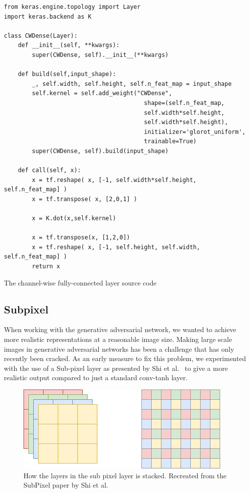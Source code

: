 \begin{listing}[h]
\begin{verbatim}
from keras.engine.topology import Layer
import keras.backend as K

class CWDense(Layer):
    def __init__(self, **kwargs):
        super(CWDense, self).__init__(**kwargs)
    
    def build(self,input_shape):
        _, self.width, self.height, self.n_feat_map = input_shape
        self.kernel = self.add_weight("CWDense",
                                        shape=(self.n_feat_map,
                                        self.width*self.height,
                                        self.width*self.height),
                                        initializer='glorot_uniform',
                                        trainable=True)        
        super(CWDense, self).build(input_shape)

    def call(self, x):
        x = tf.reshape( x, [-1, self.width*self.height, self.n_feat_map] )
        x = tf.transpose( x, [2,0,1] )

        x = K.dot(x,self.kernel)

        x = tf.transpose(x, [1,2,0])
        x = tf.reshape( x, [-1, self.height, self.width, self.n_feat_map] )
        return x

\end{verbatim}
\caption{The channel-wise fully-connected layer source code}
\label{listing:CWDense}
\end{listing}

\subsection{Subpixel}
When working with the generative adversarial network, we wanted to achieve more realistic representations at a reasonable image size. 
Making large scale images in generative adversarial networks has been a challenge that has only recently been cracked. \cite{DBLP:journals/corr/DentonCSF15} \cite{DBLP:journals/corr/abs-1809-11096}
As an early measure to fix this problem, we experimented with the use of a Sub-pixel layer as presented by Shi et al.~\cite{DBLP:journals/corr/ShiCHTABRW16} to give a more realistic output compared to just a standard conv-tanh layer.

\begin{figure}[h]
\centering
\includegraphics[scale=0.8]{methodology/figures/SubPixel.png}
\caption{How the layers in the sub pixel layer is stacked. Recreated from the SubPixel paper by Shi et al.~\cite{DBLP:journals/corr/ShiCHTABRW16}}
\label{fig:SubPixel}
\end{figure}






